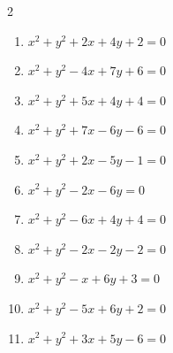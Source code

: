 \begin{multicols}{2}
\begin{enumerate}

  \item $x^{2}+y^{2}+2x+4y+2=0$


  \item $x^{2}+y^{2}-4x+7y+6=0$


  \item $x^{2}+y^{2}+5x+4y+4=0$


  \item $x^{2}+y^{2}+7x-6y-6=0$


  \item $x^{2}+y^{2}+2x-5y-1=0$


  \item $x^{2}+y^{2}-2x-6y=0$


  \item $x^{2}+y^{2}-6x+4y+4=0$

        \phantom{$\displaystyle 中心\: \left(3,-2\right), \quad 半径 \ 3$}

  \item $x^{2}+y^{2}-2x-2y-2=0$

        \phantom{$\displaystyle 中心\: \left(1,1\right), \quad 半径 \ 2$}

  \item $x^{2}+y^{2}-x+6y+3=0$


  \item $x^{2}+y^{2}-5x+6y+2=0$


  \item $x^{2}+y^{2}+3x+5y-6=0$


\end{enumerate}
\end{multicols}

